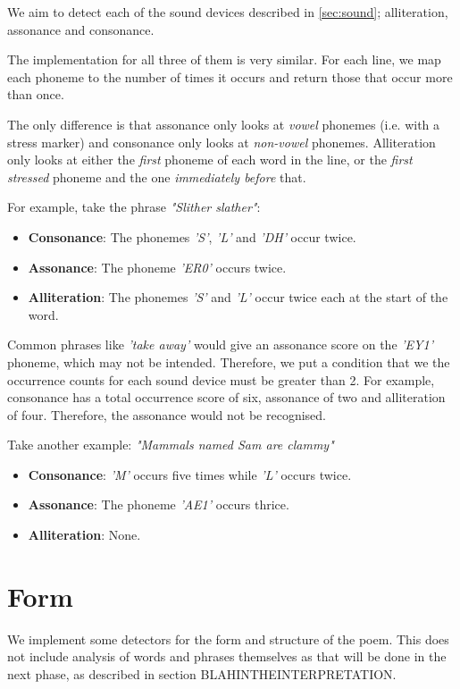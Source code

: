 We aim to detect each of the sound devices described in \ref{sec:sound}; alliteration, assonance and consonance.

The implementation for all three of them is very similar. For each line, we map each phoneme to the number of times it occurs and return those that occur more than once.

The only difference is that assonance only looks at \textit{vowel} phonemes (i.e. with a stress marker) and consonance only looks at \textit{non-vowel} phonemes. Alliteration only looks at either the \textit{first} phoneme of each word in the line, or the \textit{first stressed} phoneme and the one \textit{immediately before} that.

For example, take the phrase \textit{"Slither slather"}:
\begin{itemize}
\item{\textbf{Consonance}: The phonemes \textit{'S'}, \textit{'L'} and \textit{'DH'} occur twice.}
\item{\textbf{Assonance}: The phoneme \textit{'ER0'} occurs twice.}
\item{\textbf{Alliteration}: The phonemes \textit{'S'} and \textit{'L'} occur twice each at the start of the word.}
\end{itemize}

Common phrases like \textit{'take away'} would give an assonance score on the \textit{'EY1'} phoneme, which may not be intended. Therefore, we put a condition that we the occurrence counts for each sound device must be greater than 2. For example, consonance has a total occurrence score of six, assonance of two and alliteration of four. Therefore, the assonance would not be recognised.

Take another example: \textit{"Mammals named Sam are clammy"}
\begin{itemize}
\item{\textbf{Consonance}: \textit{'M'} occurs five times while \textit{'L'} occurs twice.}
\item{\textbf{Assonance}: The phoneme \textit{'AE1'} occurs thrice.}
\item{\textbf{Alliteration}: None.}
\end{itemize}

\section{Form}

We implement some detectors for the form and structure of the poem. This does not include analysis of words and phrases themselves as that will be done in the next phase, as described in section BLAHINTHEINTERPRETATION.

